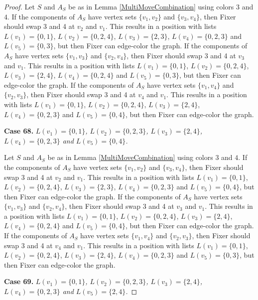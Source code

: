 \documentclass[12pt]{amsart}
\theoremstyle{plain}
\theoremstyle{definition}
\theoremstyle{remark}
\begin{document}
\begin{proof}
Let $S$ and $A_S$ be as in Lemma \ref{MultiMoveCombination} using colors $3$ and $4$. If the components of $A_S$ have vertex sets $\{v_1, v_2\}$ and $\{v_3, v_4\}$, then Fixer should swap 3 and 4 at $v_2$ and $v_1$. This results in a position with lists $L(v_1) = \{0, 1\}$, $L(v_2) = \{0, 2, 4\}$, $L(v_3) = \{2, 3\}$, $L(v_4) = \{0, 2, 3\}$ and $L(v_5) = \{0, 3\}$, but then Fixer can edge-color the graph.
If the components of $A_S$ have vertex sets $\{v_1, v_3\}$ and $\{v_2, v_4\}$, then Fixer should swap 3 and 4 at $v_3$ and $v_1$. This results in a position with lists $L(v_1) = \{0, 1\}$, $L(v_2) = \{0, 2, 4\}$, $L(v_3) = \{2, 4\}$, $L(v_4) = \{0, 2, 4\}$ and $L(v_5) = \{0, 3\}$, but then Fixer can edge-color the graph.
If the components of $A_S$ have vertex sets $\{v_1, v_4\}$ and $\{v_2, v_3\}$, then Fixer should swap 3 and 4 at $v_4$ and $v_1$. This results in a position with lists $L(v_1) = \{0, 1\}$, $L(v_2) = \{0, 2, 4\}$, $L(v_3) = \{2, 4\}$, $L(v_4) = \{0, 2, 3\}$ and $L(v_5) = \{0, 4\}$, but then Fixer can edge-color the graph.

\noindent\textbf{Case 68.  }\textit{$L(v_1) = \{0, 1\}$, $L(v_2) = \{0, 2, 3\}$, $L(v_3) = \{2, 4\}$, $L(v_4) = \{0, 2, 3\}$ and $L(v_5) = \{0, 4\}$.}

Let $S$ and $A_S$ be as in Lemma \ref{MultiMoveCombination} using colors $3$ and $4$. If the components of $A_S$ have vertex sets $\{v_1, v_2\}$ and $\{v_3, v_4\}$, then Fixer should swap 3 and 4 at $v_2$ and $v_1$. This results in a position with lists $L(v_1) = \{0, 1\}$, $L(v_2) = \{0, 2, 4\}$, $L(v_3) = \{2, 3\}$, $L(v_4) = \{0, 2, 3\}$ and $L(v_5) = \{0, 4\}$, but then Fixer can edge-color the graph.
If the components of $A_S$ have vertex sets $\{v_1, v_3\}$ and $\{v_2, v_4\}$, then Fixer should swap 3 and 4 at $v_3$ and $v_1$. This results in a position with lists $L(v_1) = \{0, 1\}$, $L(v_2) = \{0, 2, 4\}$, $L(v_3) = \{2, 4\}$, $L(v_4) = \{0, 2, 4\}$ and $L(v_5) = \{0, 4\}$, but then Fixer can edge-color the graph.
If the components of $A_S$ have vertex sets $\{v_1, v_4\}$ and $\{v_2, v_3\}$, then Fixer should swap 3 and 4 at $v_4$ and $v_1$. This results in a position with lists $L(v_1) = \{0, 1\}$, $L(v_2) = \{0, 2, 4\}$, $L(v_3) = \{2, 4\}$, $L(v_4) = \{0, 2, 3\}$ and $L(v_5) = \{0, 3\}$, but then Fixer can edge-color the graph.

\noindent\textbf{Case 69.  }\textit{$L(v_1) = \{0, 1\}$, $L(v_2) = \{0, 2, 3\}$, $L(v_3) = \{2, 4\}$, $L(v_4) = \{0, 2, 3\}$ and $L(v_5) = \{2, 4\}$.}


\end{proof}
\end{document}
